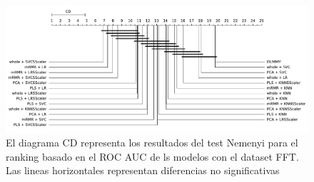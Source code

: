 \documentclass[a4paper,oneside,11pt,leqno]{article}
\begin{document}
	\begin{figure}[h]
		\includegraphics[width=\linewidth]{stat_results_fft.pdf}
		\caption{El diagrama CD representa los resultados del test Nemenyi para el ranking basado en el ROC AUC de ls modelos con el dataset FFT. Las lineas horizontales representan diferencias no significativas}
		\label{fig:stats_fig_fft}
	\end{figure}
\end{document}
